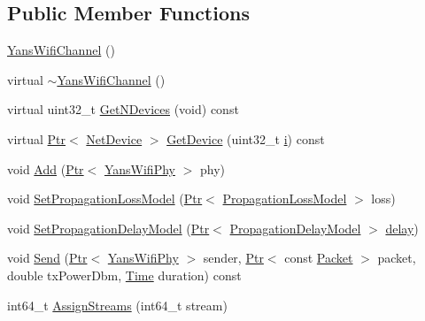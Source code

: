 \subsection*{Public Member Functions}
\begin{DoxyCompactItemize}
\item 
\hyperlink{classns3_1_1YansWifiChannel_a775f4d0a8fb1a17209e56e04896db6da}{Yans\+Wifi\+Channel} ()
\item 
virtual \hyperlink{classns3_1_1YansWifiChannel_a4a531b71d0decdd62a8fb8a60572f6af}{$\sim$\+Yans\+Wifi\+Channel} ()
\item 
virtual uint32\+\_\+t \hyperlink{classns3_1_1YansWifiChannel_a1d571d23e969b30f059acc025485a343}{Get\+N\+Devices} (void) const 
\item 
virtual \hyperlink{classns3_1_1Ptr}{Ptr}$<$ \hyperlink{classns3_1_1NetDevice}{Net\+Device} $>$ \hyperlink{classns3_1_1YansWifiChannel_a22b2ff316df9f3c0eaf3540e4d32db34}{Get\+Device} (uint32\+\_\+t \hyperlink{lte__uplink__power__control_8m_a6f6ccfcf58b31cb6412107d9d5281426}{i}) const 
\item 
void \hyperlink{classns3_1_1YansWifiChannel_af9a690bedc2b5e0c1f71356dd268411b}{Add} (\hyperlink{classns3_1_1Ptr}{Ptr}$<$ \hyperlink{classns3_1_1YansWifiPhy}{Yans\+Wifi\+Phy} $>$ phy)
\item 
void \hyperlink{classns3_1_1YansWifiChannel_ad2f92be1fb34be0075141cbb4f779191}{Set\+Propagation\+Loss\+Model} (\hyperlink{classns3_1_1Ptr}{Ptr}$<$ \hyperlink{classns3_1_1PropagationLossModel}{Propagation\+Loss\+Model} $>$ loss)
\item 
void \hyperlink{classns3_1_1YansWifiChannel_a51ebdd5a1d897dc46cf9783ac2879b98}{Set\+Propagation\+Delay\+Model} (\hyperlink{classns3_1_1Ptr}{Ptr}$<$ \hyperlink{classns3_1_1PropagationDelayModel}{Propagation\+Delay\+Model} $>$ \hyperlink{mmwave_2model_2fading-traces_2fading__trace__generator_8m_a7964e6aa8f61a9d28973c8267a606ad8}{delay})
\item 
void \hyperlink{classns3_1_1YansWifiChannel_a670a71202a077cf71711b560fd894a7a}{Send} (\hyperlink{classns3_1_1Ptr}{Ptr}$<$ \hyperlink{classns3_1_1YansWifiPhy}{Yans\+Wifi\+Phy} $>$ sender, \hyperlink{classns3_1_1Ptr}{Ptr}$<$ const \hyperlink{classns3_1_1Packet}{Packet} $>$ packet, double tx\+Power\+Dbm, \hyperlink{classns3_1_1Time}{Time} duration) const 
\item 
int64\+\_\+t \hyperlink{classns3_1_1YansWifiChannel_aed5d287a608e3c3f48751a6ce24a1407}{Assign\+Streams} (int64\+\_\+t stream)
\end{DoxyCompactItemize}
